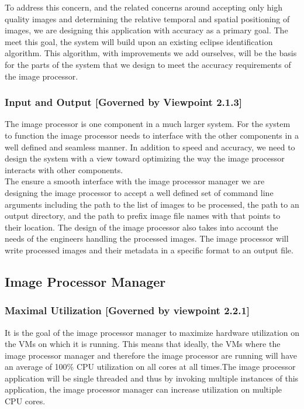 \documentclass[10pt, onecolumn, draftclsnofoot, letterpaper, compsoc]{IEEEtran}
\begin{document}
To address this concern, and the related concerns around accepting only high
quality images and determining the relative temporal and spatial positioning of
images, we are designing this application with accuracy as a primary goal. The
meet this goal, the system will build upon an existing eclipse identification
algorithm. This algorithm, with improvements we add ourselves, will be the basis
for the parts of the system that we design to meet the accuracy requirements of
the image processor.\\

\subsubsection{Input and Output [Governed by Viewpoint 2.1.3]}

The image processor is one component in a much larger system. For the system to
function the image processor needs to interface with the other components in a
well defined and seamless manner. In addition to speed and accuracy, we need to
design the system with a view toward optimizing the way the image processor
interacts with other components.\\

The ensure a smooth interface with the image processor manager we are designing
the image processor to accept a well defined set of command line arguments
including the path to the list of images to be processed, the path to an output
directory, and the path to prefix image file names with that points to their
location. The design of the image processor also takes into account the needs of
the engineers handling the processed images. The image processor will write
processed images and their metadata in a specific format to an output file.\\

\subsection{Image Processor Manager}

    \subsubsection{Maximal Utilization [Governed by viewpoint 2.2.1]}
    It is the goal of the image processor manager to maximize hardware utilization on the VMs on which it is
    running. This means that ideally, the VMs where the image processor manager and therefore the image
    processor are running will have an average of 100\% CPU utilization on all cores at all times.The image
    processor application will be single threaded and thus by invoking multiple instances of this application,
    the image processor manager can increase utilization on multiple CPU cores. \\
\end{document}
